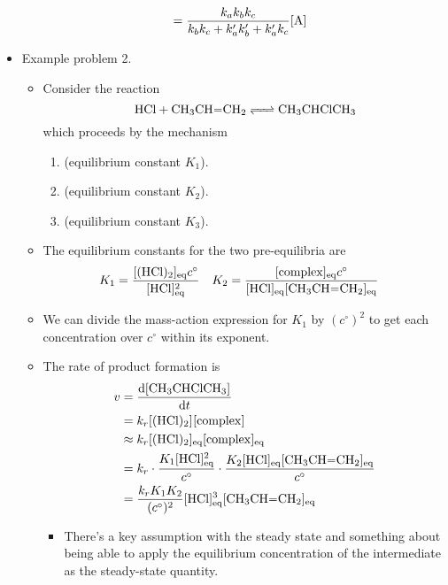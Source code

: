 \documentclass[../notes.tex]{subfiles}
\begin{document}
\begin{itemize}
\begin{itemize}
\begin{align*}
            &= \frac{k_ak_bk_c}{k_bk_c+k_a'k_b'+k_a'k_c}\cnc{A}
        \end{align*}
    \end{itemize}
    \item Example problem 2.
    \begin{itemize}
        \item Consider the reaction
        \begin{equation*}
            \ce{HCl + CH3CH=CH2 <=> CH3CHClCH3}
        \end{equation*}
        which proceeds by the mechanism
        \begin{enumerate}
            \item {} (equilibrium constant $K_1$).
            \item {} (equilibrium constant $K_2$).
            \item {} (equilibrium constant $K_3$).
        \end{enumerate}
        \item The equilibrium constants for the two pre-equilibria are
        \begin{align*}
            K_1 &= \frac{\cnc[eq]{(HCl)2}c^\circ}{\cnc[eq]{HCl}^2}&
            K_2 &= \frac{\cnc[eq]{complex}c^\circ}{\cnc[eq]{HCl}\cnc[eq]{CH3CH=CH2}}
        \end{align*}
        \item We can divide the mass-action expression for $K_1$ by $(c^\circ)^2$ to get each concentration over $c^\circ$ within its exponent.
        \item The rate of product formation is
        \begin{align*}
            v &= \dv{\cnc{CH3CHClCH3}}{t}\\
            &= k_r\cnc{(HCl)2}\cnc{complex}\\
            &\approx k_r\cnc[eq]{(HCl)2}\cnc[eq]{complex}\\
            &= k_r\cdot\frac{K_1\cnc[eq]{HCl}^2}{c^\circ}\cdot\frac{K_2\cnc[eq]{HCl}\cnc[eq]{CH3CH=CH2}}{c^\circ}\\
            &= \frac{k_rK_1K_2}{(c^\circ)^2}\cnc[eq]{HCl}^3\cnc[eq]{CH3CH=CH2}
        \end{align*}
        \begin{itemize}
            \item There's a key assumption with the steady state and something about being able to apply the equilibrium concentration of the intermediate as the steady-state quantity.

\end{itemize}
\end{itemize}
\end{itemize}
\end{document}

